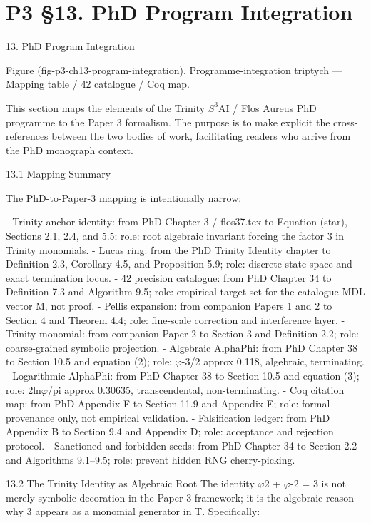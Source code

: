 
\section{P3 §13. PhD Program Integration}

13. PhD Program Integration

   Figure (fig-p3-ch13-program-integration). Programme-integration triptych --- Mapping table / 42
                                        catalogue / Coq map.

  This section maps the elements of the Trinity $S^{3}$AI / Flos Aureus PhD programme to the
  Paper 3 formalism. The purpose is to make explicit the cross-references between the
  two bodies of work, facilitating readers who arrive from the PhD monograph context.

  13.1 Mapping Summary

  The PhD-to-Paper-3 mapping is intentionally narrow:

  - Trinity anchor identity: from PhD Chapter 3 / flos37.tex to Equation (star), Sections
  2.1, 2.4, and 5.5; role: root algebraic invariant forcing the factor 3 in Trinity monomials.
  - Lucas ring: from the PhD Trinity Identity chapter to Definition 2.3, Corollary 4.5, and
  Proposition 5.9; role: discrete state space and exact termination locus.
  - 42 precision catalogue: from PhD Chapter 34 to Definition 7.3 and Algorithm 9.5; role:
  empirical target set for the catalogue MDL vector M, not proof.
  - Pellis expansion: from companion Papers 1 and 2 to Section 4 and Theorem 4.4; role:
  fine-scale correction and interference layer.
  - Trinity monomial: from companion Paper 2 to Section 3 and Definition 2.2; role:
  coarse-grained symbolic projection.
  - Algebraic AlphaPhi: from PhD Chapter 38 to Section 10.5 and equation (2); role: $\varphi$-3/2
  approx 0.118, algebraic, terminating.
  - Logarithmic AlphaPhi: from PhD Chapter 38 to Section 10.5 and equation (3); role:
  2ln$\varphi$/pi approx 0.30635, transcendental, non-terminating.
  - Coq citation map: from PhD Appendix F to Section 11.9 and Appendix E; role: formal
  provenance only, not empirical validation.
  - Falsification ledger: from PhD Appendix B to Section 9.4 and Appendix D; role:
  acceptance and rejection protocol.
  - Sanctioned and forbidden seeds: from PhD Chapter 34 to Section 2.2 and Algorithms
  9.1--9.5; role: prevent hidden RNG cherry-picking.

  13.2 The Trinity Identity as Algebraic Root
  The identity $\varphi$2 + $\varphi$-2 = 3 is not merely symbolic decoration in the Paper 3 framework;
  it is the algebraic reason why 3 appears as a monomial generator in T. Specifically:

